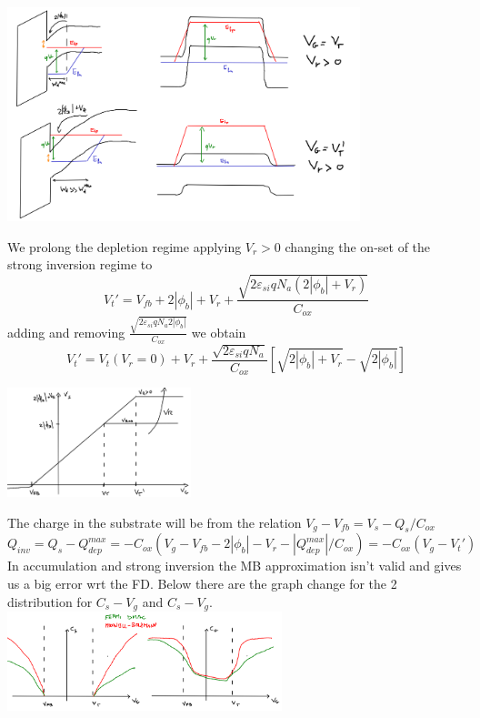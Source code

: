 \centering
\includegraphics[width=0.77\textwidth]{mosring.png}\\
\raggedright
We prolong the depletion regime applying $V_r>0$ changing the on-set of the strong inversion regime to 
\begin{equation}
V_t'=V_{fb}+2|\phi_b|+V_r+\frac{\sqrt{2\varepsilon_{si}qN_a(2|\phi_b|+V_r)}}{C_{ox}}
\end{equation}
adding and removing $\frac{\sqrt{2\varepsilon_{si}qN_a2|\phi_b|}}{C_{ox}}$ we obtain
\begin{equation}
V_t'=V_t(V_r=0)+V_r+\frac{\sqrt{2\varepsilon_{si}qN_a}}{C_{ox}}[\sqrt{2|\phi_b|+V_r}-\sqrt{2|\phi_b|}]
\end{equation}

\centering
\includegraphics[width=0.4\textwidth]{vtprimo.png}\\
\raggedright

The charge in the substrate will be from the relation $V_g-V_{fb}=V_s-Q_s/C_{ox}$ 
\begin{equation}
Q_{inv}=Q_s-Q_{dep}^{max}=-C_{ox}(V_g-V_{fb}-2|\phi_b|-V_r-|Q_{dep}^{max}|/C_{ox})=-C_{ox}(V_g-V_t')
\end{equation}
In accumulation and strong inversion the MB approximation isn't valid and gives us a big error wrt the FD. Below there are the graph change for the 2 distribution for $C_s-V_g$ and $C_s-V_g$.\\

\centering
\includegraphics[width=0.6\textwidth]{mbvsfdmos.png}\\
\raggedright


